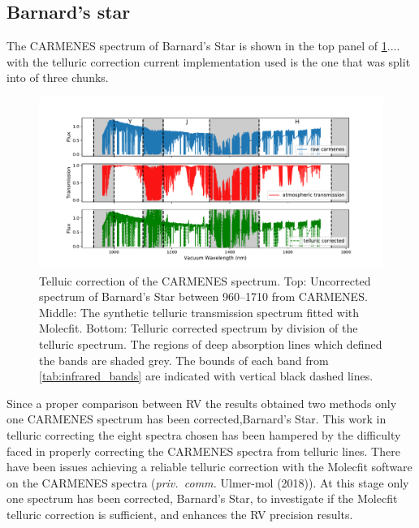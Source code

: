 \subsection{Barnard's star}
\label{sec:carmenes_barnards_star}
The {CARMENES} spectrum of Barnard's Star is shown in the top panel of \cref{fig:carmenes_correction}....
with the telluric correction current implementation used is the one that was split into of three chunks.


\begin{figure}
    \centering
    \includegraphics[width=0.9\linewidth]{figures/information-content/Carmenes/telluric_correct_carmenes}
    \caption[Telluic correction of the {CARMENES} \nir{} spectrum.]{Telluic correction of the {CARMENES} \nir{} spectrum.
        Top: Uncorrected spectrum of Barnard's Star between 960--1710\nm{} from {CARMENES}.
        Middle: The synthetic telluric transmission spectrum fitted with {Molecfit}.
        Bottom: Telluric corrected spectrum by division of the telluric spectrum.
        The regions of deep  absorption lines which defined the \nir{} bands are shaded grey.
        The bounds of each band from \cref{tab:infrared_bands} are indicated with vertical black dashed lines.}
    \label{fig:carmenes_correction}
\end{figure}

Since a proper comparison between {RV} the results obtained two methods only one {CARMENES} spectrum has been corrected,Barnard's Star.
This work in telluric correcting the eight spectra chosen has been hampered by the difficulty faced in properly correcting the {CARMENES} spectra from telluric lines.
There have been issues achieving a reliable telluric correction with the {Molecfit} software on the {CARMENES} spectra (\emph{priv.\ comm.} Ulmer-mol (2018)).
At this stage only one spectrum has been corrected, Barnard's Star, to investigate if the {Molecfit} telluric correction is sufficient, and enhances the {RV} precision results.

